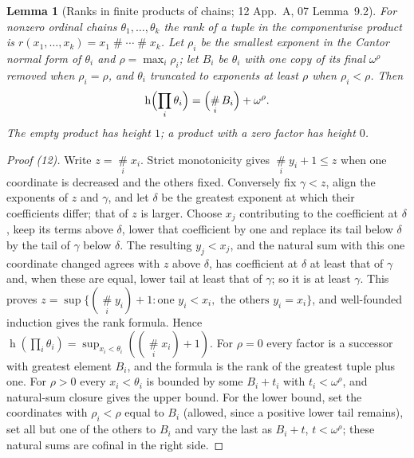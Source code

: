 \documentclass[11pt,a4paper]{article}
\newtheorem{lemma}[theorem]{Lemma}
\theoremstyle{definition}
\theoremstyle{remark}
\newcommand{\hgt}{\operatorname{h}}
\newcommand{\ns}{\mathbin{\#}}
\newcommand{\bigns}{\mathop{\#}\limits}
\begin{document}
\begin{lemma}[Ranks in finite products of chains; 12 App.~A, 07 Lemma~9.2]
\label{nh:lem:productrank}
For nonzero ordinal chains $\theta_1,\dots,\theta_k$ the rank of a tuple in the
componentwise product is $r(x_1,\dots,x_k)=x_1\ns\cdots\ns x_k$. Let $\rho_i$ be
the smallest exponent in the Cantor normal form of $\theta_i$ and
$\rho=\max_i\rho_i$; let $B_i$ be $\theta_i$ with one copy of its final
$\omega^\rho$ removed when $\rho_i=\rho$, and $\theta_i$ truncated to exponents
at least $\rho$ when $\rho_i<\rho$. Then
\begin{equation}\label{nh:eq:MR}
 \hgt\Bigl(\prod_i\theta_i\Bigr)=\Bigl(\bigns_iB_i\Bigr)+\omega^\rho .
\end{equation}
The empty product has height $1$; a product with a zero factor has height $0$.
\end{lemma}
\begin{proof}[Proof (12)]
Write $z=\bigns_ix_i$. Strict monotonicity gives $\bigns_iy_i+1\le z$ when one
coordinate is decreased and the others fixed. Conversely fix $\gamma<z$, align
the exponents of $z$ and $\gamma$, and let $\delta$ be the greatest exponent at
which their coefficients differ; that of $z$ is larger. Choose $x_j$ contributing
to the coefficient at $\delta$, keep its terms above $\delta$, lower that
coefficient by one and replace its tail below $\delta$ by the tail of $\gamma$
below $\delta$. The resulting $y_j<x_j$, and the natural sum with this one
coordinate changed agrees with $z$ above $\delta$, has coefficient at $\delta$ at
least that of $\gamma$ and, when these are equal, lower tail at least that of
$\gamma$; so it is at least $\gamma$. This proves
$z=\sup\{(\bigns_iy_i)+1:\text{one }y_i<x_i,\text{ the others }y_i=x_i\}$, and
well-founded induction gives the rank formula. Hence
$\hgt(\prod_i\theta_i)=\sup_{x_i<\theta_i}((\bigns_ix_i)+1)$. For $\rho=0$
every factor is a successor with greatest element $B_i$, and the formula is the
rank of the greatest tuple plus one. For $\rho>0$ every $x_i<\theta_i$ is bounded
by some $B_i+t_i$ with $t_i<\omega^\rho$, and natural-sum closure gives the upper
bound. For the lower bound, set the coordinates with $\rho_i<\rho$ equal to
$B_i$ (allowed, since a positive lower tail remains), set all but one of the
others to $B_i$ and vary the last as $B_i+t$, $t<\omega^\rho$; these natural sums
are cofinal in the right side.
\end{proof}
\end{document}
